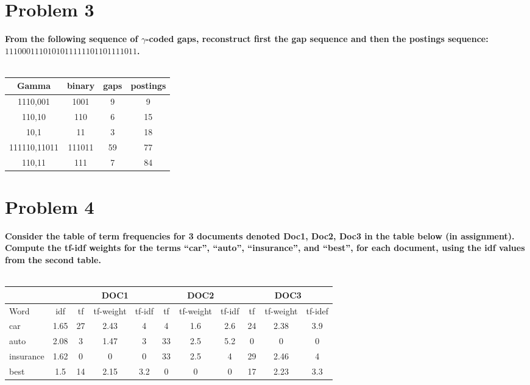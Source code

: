 \documentclass{article}
\begin{document}
\section{Problem 3}

\textbf{From the following sequence of $\gamma$-coded gaps, reconstruct first the gap sequence and then the postings sequence: $1110001 11010 101 11111011011 11011$.}
\\
\\
\begin{tabular}{ c|c|c|c } 

 Gamma & binary & gaps & postings \\ 
 \hline
 1110,001 & 1001 & 9 & 9\\ 
 110,10 & 110 & 6 & 15\\ 
 10,1 & 11 & 3 & 18\\ 
 111110,11011 & 111011 & 59 & 77\\ 
 110,11 & 111 & 7 & 84\\ 

\end{tabular}

\pagebreak

\section{Problem 4}

\textbf{Consider the table of term frequencies for 3 documents denoted Doc1, Doc2, Doc3 in the table below (in assignment). Compute the tf-idf weights for the terms “car”, “auto”, “insurance”, and “best”, for each document, using the idf values from the second table.}
\\
\\
\begin{tabular}{lc|ccc|ccc|ccc}
                               &      & \multicolumn{3}{c|}{DOC1} & \multicolumn{3}{c|}{DOC2} & \multicolumn{3}{c}{DOC3} \\ \hline
\multicolumn{1}{l|}{Word}      & idf  & tf  & tf-weight  & tf-idf & tf  & tf-weight  & tf-idf & tf & tf-weight & tf-idef \\ \hline
\multicolumn{1}{l|}{car}       & 1.65 & 27  & 2.43       & 4      & 4   & 1.6        & 2.6    & 24 & 2.38      & 3.9     \\
\multicolumn{1}{l|}{auto}      & 2.08 & 3   & 1.47       & 3      & 33  & 2.5        & 5.2    & 0  & 0         & 0       \\
\multicolumn{1}{l|}{insurance} & 1.62 & 0   & 0          & 0      & 33  & 2.5        & 4      & 29 & 2.46      & 4       \\
\multicolumn{1}{l|}{best}      & 1.5  & 14  & 2.15       & 3.2    & 0   & 0          & 0      & 17 & 2.23      & 3.3    
\end{tabular}
\end{document}
